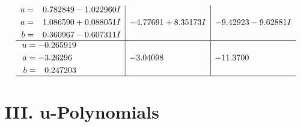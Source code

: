\documentclass[1p]{elsarticle_modified}
\theoremstyle{definition}
\begin{document}
$$\begin{array}{c|c|c}
\begin{aligned}
u &= \phantom{-}0.782849 - 1.022960 I \\
a &= \phantom{-}1.086590 + 0.088051 I \\
b &= \phantom{-}0.360967 - 0.607311 I\end{aligned}
 & -4.77691 + 8.35173 I & -9.42923 - 9.62881 I \\ \hline\begin{aligned}
u &= -0.265919\phantom{ +0.000000I} \\
a &= -3.26296\phantom{ +0.000000I} \\
b &= \phantom{-}0.247203\phantom{ +0.000000I}\end{aligned}
 & -3.04098\phantom{ +0.000000I} & -11.3700\phantom{ +0.000000I}\\
 \hline 
 \end{array}$$\newpage
\newpage\renewcommand{\arraystretch}{1}
\centering \section*{ III. u-Polynomials}
\end{document}

